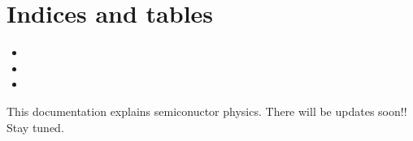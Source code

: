 \documentclass[a4paper,10pt,english]{sphinxmanual}
\begin{document}
\chapter{Indices and tables}
\label{\detokenize{index:indices-and-tables}}\begin{itemize}
\item {} 
\sphinxAtStartPar
{}

\item {} 
\sphinxAtStartPar
{}

\item {} 
\sphinxAtStartPar
{}

\end{itemize}

\sphinxAtStartPar
This documentation explains semiconuctor physics.
There will be updates soon!!
Stay tuned.



\renewcommand{\indexname}{Index}
\printindex
\end{document}
